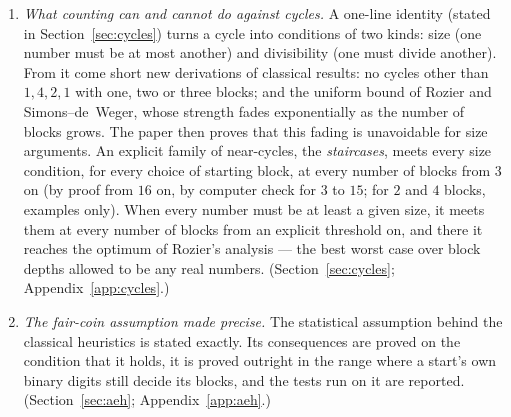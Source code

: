 \documentclass[11pt]{article}
\theoremstyle{remark}
\begin{document}
\begin{enumerate}
\item[(v)] \emph{What counting can and cannot do against cycles.} A one-line identity (stated in Section~\ref{sec:cycles}) turns a cycle into conditions of two kinds: size (one number must be at most another) and divisibility (one must divide another). From it come short new derivations of classical results: no cycles other than $1, 4, 2, 1$ with one, two or three blocks; and the uniform bound of Rozier and Simons--de~Weger, whose strength fades exponentially as the number of blocks grows. The paper then proves that this fading is unavoidable for size arguments. An explicit family of near-cycles, the \emph{staircases}, meets every size condition, for every choice of starting block, at every number of blocks from $3$ on (by proof from $16$ on, by computer check for $3$ to $15$; for $2$ and $4$ blocks, examples only). When every number must be at least a given size, it meets them at every number of blocks from an explicit threshold on, and there it reaches the optimum of Rozier's analysis --- the best worst case over block depths allowed to be any real numbers. (Section~\ref{sec:cycles}; Appendix~\ref{app:cycles}.)
\item[(vi)] \emph{The fair-coin assumption made precise.} The statistical assumption behind the classical heuristics is stated exactly. Its consequences are proved on the condition that it holds, it is proved outright in the range where a start's own binary digits still decide its blocks, and the tests run on it are reported. (Section~\ref{sec:aeh}; Appendix~\ref{app:aeh}.)
\end{enumerate}
\end{document}

